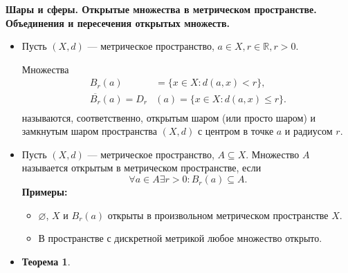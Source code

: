 \documentclass[a4paper,100pt]{article}
\theoremstyle{indented}
\newtheorem{theorem}{Теорема}
\begin{document}
\medskip

\textbf{Шары и сферы. Открытые множества в метрическом пространстве. Объединения и пересечения открытых множеств.}
    \begin{itemize}
    \item Пусть $\left(X, d\right)$ --- метрическое пространство, $a \in X, r \in \mathbb R, r > 0.$
    
    Множества 
    \[
    \begin{aligned}
        B_r(a) &= \{x \in X : d(a,x) < r\}, \\
        \overline{B_r} (a) = D_r &(a) = \{x \in X: d(a,x) \leq r\}. \\
    \end{aligned}
    \]
    называются, соответственно, открытым шаром (или просто шаром) и замкнутым шаром пространства $\left(X,d\right)$ с центром в точке $a$ и радиусом $r$.
    \item Пусть $\left(X, d\right)$ --- метрическое пространство, $A \subseteq X$. Множество $A$ называется открытым в метрическом пространстве, если
    \[
        \forall a \in A \exists r > 0: B_r(a) \subseteq A.
    \]
    \textbf{Примеры:} \begin{itemize}
        \item $\varnothing$, $X$ и $B_r(a)$ открыты в произвольном метрическом пространстве $X$.
        \item В пространстве с дискретной метрикой любое множество открыто.
    \end{itemize}
    \item 
    \begin{theorem}
    

\end{theorem}
\end{itemize}
\end{document}
